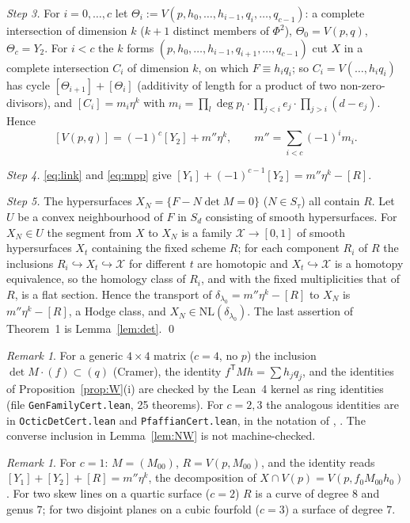 \documentclass[11pt]{article}
\numberwithin{equation}{section}
\theoremstyle{remark}
\newtheorem{remark}[theorem]{Remark}
\newcommand{\NL}{\mathrm{NL}}
\newcommand{\cX}{\mathcal{X}}
\newcommand{\T}{\mathsf{T}}
\newcommand{\lz}{\lambda_0}
\begin{document}
\emph{Step 3.} For $i=0,\dots,c$ let $\Theta_i:=V(p,h_0,\dots,h_{i-1},q_i,\dots,q_{c-1})$: a complete intersection of
dimension $k$ ($k+1$ distinct members of $\Phi^2$), $\Theta_0=V(p,q)$, $\Theta_c=Y_2$. For $i<c$ the $k$ forms
$(p,h_0,\dots,h_{i-1},q_{i+1},\dots,q_{c-1})$ cut $X$ in a complete intersection $C_i$ of dimension $k$, on which
$F\equiv h_iq_i$; so $C_i=V(\dots,h_iq_i)$ has cycle $[\Theta_{i+1}]+[\Theta_i]$ (additivity of length for a product
of two non-zero-divisors), and $[C_i]=m_i\eta^k$ with
$m_i=\prod_l\deg p_l\cdot\prod_{j<i}e_j\cdot\prod_{j>i}(d-e_j)$. Hence
\begin{equation}\label{eq:mpp}
[V(p,q)]=(-1)^c[Y_2]+m''\eta^k,\qquad m''=\sum_{i<c}(-1)^im_i .
\end{equation}

\emph{Step 4.} \eqref{eq:link} and \eqref{eq:mpp} give $[Y_1]+(-1)^{c-1}[Y_2]=m''\eta^k-[R]$.

\emph{Step 5.} The hypersurfaces $X_N=\{F-N\det M=0\}$ ($N\in S_\tau$) all contain $R$. Let $U$ be a convex
neighbourhood of $F$ in $S_d$ consisting of smooth hypersurfaces. For $X_N\in U$ the segment from $X$ to $X_N$
is a family $\cX\to[0,1]$ of smooth hypersurfaces $X_t$ containing the fixed scheme $R$; for each component
$R_i$ of $R$ the inclusions $R_i\hookrightarrow X_t\hookrightarrow\cX$ for different $t$ are homotopic and
$X_t\hookrightarrow\cX$ is a homotopy equivalence, so the homology class of $R_i$, and with the fixed
multiplicities that of $R$, is a flat section. Hence the transport of $\delta_{\lz}=m''\eta^k-[R]$ to $X_N$ is
$m''\eta^k-[R]$, a Hodge class, and $X_N\in\NL(\delta_{\lz})$. The last assertion of Theorem~1 is
Lemma~\ref{lem:det}. \qed

\begin{remark}\label{rem:lean}
For a generic $4\times4$ matrix ($c=4$, no $p$) the inclusion $\det M\cdot(f)\subset(q)$ (Cramer), the identity
$f^\T Mh=\sum h_jq_j$, and the identities of Proposition~\ref{prop:W}(i) are checked by the Lean~4 kernel as
ring identities (file \texttt{GenFamilyCert.lean}, 25 theorems). For $c=2,3$ the analogous identities are in
\texttt{OcticDetCert.lean} and \texttt{PfaffianCert.lean}, in the notation of \cite{P2}, \cite{P1}. The converse
inclusion in Lemma~\ref{lem:NW} is not machine-checked.
\end{remark}

\begin{remark}
For $c=1$: $M=(M_{00})$, $R=V(p,M_{00})$, and the identity reads $[Y_1]+[Y_2]+[R]=m''\eta^k$, the decomposition
of $X\cap V(p)=V(p,f_0M_{00}h_0)$. For two skew lines on a quartic surface ($c=2$) $R$ is a curve of degree $8$
and genus $7$; for two disjoint planes on a cubic fourfold ($c=3$) a surface of degree $7$.
\end{remark}
\end{document}
